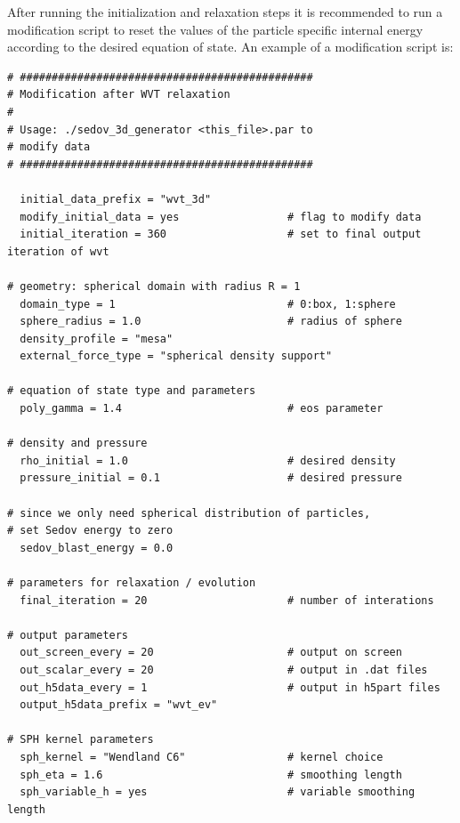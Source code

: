 \documentclass{article}
\begin{document}
After running the initialization and relaxation steps it is recommended to run a modification script to reset the values of the particle specific internal energy according to the desired equation of state. An example of a modification script is:
\begin{lstlisting}
# ##############################################
# Modification after WVT relaxation
#
# Usage: ./sedov_3d_generator <this_file>.par to 
# modify data
# ##############################################

  initial_data_prefix = "wvt_3d"
  modify_initial_data = yes                 # flag to modify data
  initial_iteration = 360                   # set to final output iteration of wvt

# geometry: spherical domain with radius R = 1
  domain_type = 1                           # 0:box, 1:sphere
  sphere_radius = 1.0                       # radius of sphere 
  density_profile = "mesa"
  external_force_type = "spherical density support"

# equation of state type and parameters
  poly_gamma = 1.4                          # eos parameter

# density and pressure
  rho_initial = 1.0                         # desired density
  pressure_initial = 0.1                    # desired pressure 

# since we only need spherical distribution of particles,
# set Sedov energy to zero
  sedov_blast_energy = 0.0

# parameters for relaxation / evolution
  final_iteration = 20                      # number of interations 

# output parameters
  out_screen_every = 20                     # output on screen
  out_scalar_every = 20                     # output in .dat files
  out_h5data_every = 1                      # output in h5part files
  output_h5data_prefix = "wvt_ev"

# SPH kernel parameters
  sph_kernel = "Wendland C6"                # kernel choice
  sph_eta = 1.6                             # smoothing length
  sph_variable_h = yes                      # variable smoothing length
\end{lstlisting}
\end{document}
